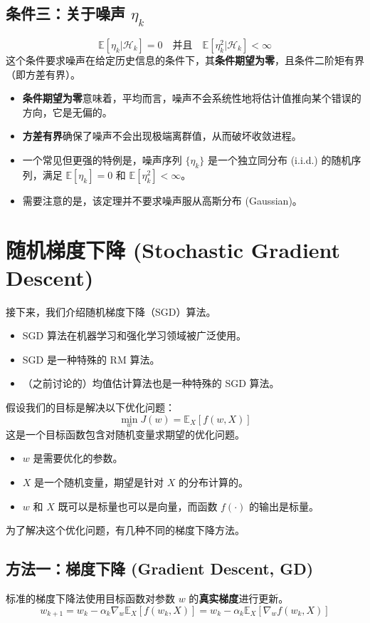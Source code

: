 \documentclass[12pt, a4paper]{article}
\newcommand{\E}{\mathbb{E}} %
\begin{document}
\subsection{条件三：关于噪声 $\eta_k$}
\[ 
\E[\eta_k | \mathcal{H}_k] = 0 \quad \text{并且} \quad \E[\eta_k^2 | \mathcal{H}_k] < \infty 
\]
这个条件要求噪声在给定历史信息的条件下，其\textbf{条件期望为零}，且条件二阶矩有界（即方差有界）。
\begin{itemize}
    \item \textbf{条件期望为零}意味着，平均而言，噪声不会系统性地将估计值推向某个错误的方向，它是无偏的。
    \item \textbf{方差有界}确保了噪声不会出现极端离群值，从而破坏收敛进程。
    \item 一个常见但更强的特例是，噪声序列 $\{\eta_k\}$ 是一个独立同分布 (i.i.d.) 的随机序列，满足 $\E[\eta_k] = 0$ 和 $\E[\eta_k^2] < \infty$。
    \item 需要注意的是，该定理并不要求噪声服从高斯分布 (Gaussian)。
\end{itemize}

\section{随机梯度下降 (Stochastic Gradient Descent)}
接下来，我们介绍随机梯度下降（SGD）算法。
\begin{itemize}
    \item SGD 算法在机器学习和强化学习领域被广泛使用。
    \item SGD 是一种特殊的 RM 算法。
    \item （之前讨论的）均值估计算法也是一种特殊的 SGD 算法。
\end{itemize}
假设我们的目标是解决以下优化问题：
\[
\min_w J(w) = \E_X[f(w, X)]
\]
这是一个目标函数包含对随机变量求期望的优化问题。
\begin{itemize}
    \item $w$ 是需要优化的参数。
    \item $X$ 是一个随机变量，期望是针对 $X$ 的分布计算的。
    \item $w$ 和 $X$ 既可以是标量也可以是向量，而函数 $f(\cdot)$ 的输出是标量。
\end{itemize}

为了解决这个优化问题，有几种不同的梯度下降方法。

\subsection{方法一：梯度下降 (Gradient Descent, GD)}
标准的梯度下降法使用目标函数对参数 $w$ 的\textbf{真实梯度}进行更新。
\[
w_{k+1} = w_k - \alpha_k \nabla_w \E_X[f(w_k, X)] = w_k - \alpha_k \E_X[\nabla_w f(w_k, X)]
\]
\end{document}
